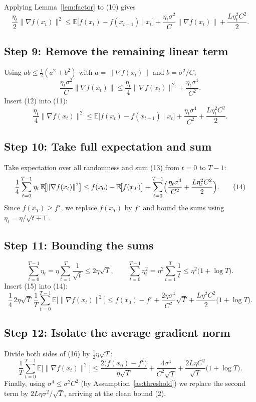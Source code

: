 \documentclass{article}
\newcommand{\E}{\mathbb{E}}
\newcommand{\norm}[1]{\left\lVert #1\right\rVert}
\begin{document}
Applying Lemma~\ref{lem:factor} to (10) gives
\[
\frac{\eta_t}{2}\|\nabla f(x_t)\|^{2}
\le
\E\!\bigl[f(x_t)-f(x_{t+1})\mid x_t\bigr]
+\frac{\eta_t\sigma^{2}}{C}\norm{\nabla f(x_t)}
+\frac{L\eta_t^{2}C^{2}}{2}. \tag{11}
\]

\subsection*{Step 9: Remove the remaining linear term}
Using $ab\le \tfrac12(a^{2}+b^{2})$ with $a=\norm{\nabla f(x_t)}$ and $b=\sigma^{2}/C$,
\[
\frac{\eta_t\sigma^{2}}{C}\norm{\nabla f(x_t)}
\le
\frac{\eta_t}{4}\|\nabla f(x_t)\|^{2}
+\frac{\eta_t\sigma^{4}}{C^{2}}. \tag{12}
\]
Insert (12) into (11):
\[
\frac{\eta_t}{4}\|\nabla f(x_t)\|^{2}
\le
\E\!\bigl[f(x_t)-f(x_{t+1})\mid x_t\bigr]
+\frac{\eta_t\sigma^{4}}{C^{2}}
+\frac{L\eta_t^{2}C^{2}}{2}. \tag{13}
\]

\subsection*{Step 10: Take full expectation and sum}
Take expectation over all randomness and sum (13) from $t=0$ to $T-1$:
\[
\frac{1}{4}\sum_{t=0}^{T-1}\eta_t\,\E\!\bigl[\|\nabla f(x_t)\|^{2}\bigr]
\le
f(x_0)-\E\!\bigl[f(x_T)\bigr]
+\sum_{t=0}^{T-1}\Bigl(\frac{\eta_t\sigma^{4}}{C^{2}}+\frac{L\eta_t^{2}C^{2}}{2}\Bigr). \tag{14}
\]
Since $f(x_T)\ge f^\star$, we replace $f(x_T)$ by $f^\star$ and bound the sums using $\eta_t=\eta/\sqrt{t+1}$.

\subsection*{Step 11: Bounding the sums}
\[
\sum_{t=0}^{T-1}\eta_t
= \eta\sum_{t=1}^{T}\frac{1}{\sqrt{t}}
\le 2\eta\sqrt{T}, \qquad
\sum_{t=0}^{T-1}\eta_t^{2}
= \eta^{2}\sum_{t=1}^{T}\frac{1}{t}
\le \eta^{2}\bigl(1+\log T\bigr). \tag{15}
\]
Insert (15) into (14):
\[
\frac{1}{4}\,2\eta\sqrt{T}\,\frac{1}{T}\sum_{t=0}^{T-1}\E\!\bigl[\|\nabla f(x_t)\|^{2}\bigr]
\le
f(x_0)-f^\star
+\frac{2\eta\sigma^{4}}{C^{2}}\sqrt{T}
+\frac{L\eta^{2}C^{2}}{2}\bigl(1+\log T\bigr). \tag{16}
\]

\subsection*{Step 12: Isolate the average gradient norm}
Divide both sides of (16) by $\frac{1}{2}\eta\sqrt{T}$:
\[
\frac{1}{T}\sum_{t=0}^{T-1}\E\!\bigl[\|\nabla f(x_t)\|^{2}\bigr]
\le
\frac{2\bigl(f(x_0)-f^\star\bigr)}{\eta\sqrt{T}}
+\frac{4\sigma^{4}}{C^{2}\sqrt{T}}
+\frac{2L\eta C^{2}}{\sqrt{T}}\bigl(1+\log T\bigr). \tag{17}
\]
Finally, using $\sigma^{4}\le \sigma^{2}C^{2}$ (by Assumption~\ref{as:threshold}) we replace the second term by $2L\eta\sigma^{2}/\sqrt{T}$, arriving at the clean bound (2).
\end{document}
